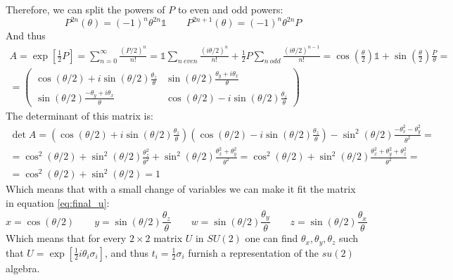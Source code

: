 \documentclass{article}
\begin{document}
Therefore, we can split the powers of $P$ to even and odd powers:
\begin{equation}
    P^{2n}(\theta) = \left(-1\right)^n\theta^{2n}\mathbb{1} \qquad P^{2n+1}(\theta) = \left(-1\right)^n\theta^{2n}P
\end{equation}
And thus
\begin{equation}
\begin{gathered}
\label{eq:su_final_rep}
    A = \exp \left[\frac{1}{2}P\right] = \sum_{n=0}^\infty \frac{(P/2)^n}{n!} =
    \mathbb{1}\sum_{n \ even}\frac{\left(i\theta/2\right)^n}{n!} + \frac{1}{2}P\sum_{n \ odd}\frac{\left(i\theta/2\right)^{n - 1}}{n!} = \cos(\frac{\theta}{2})\mathbb{1} + \sin(\frac{\theta}{2}) \frac{P}{\theta} = \\
    = \begin{pmatrix}
        \cos(\theta/2) + i\sin(\theta/2)\frac{\theta_z}{\theta} & \sin(\theta/2)\frac{\theta_y + i\theta_x}{\theta} \\ 
        \sin(\theta/2)\frac{-\theta_y + i\theta_x}{\theta} & \cos(\theta/2) - i\sin(\theta/2)\frac{\theta_z}{\theta}
    \end{pmatrix}
\end{gathered}
\end{equation}
The determinant of this matrix is:
\begin{equation}
\begin{gathered}
    \det A = \left(\cos(\theta/2) + i\sin(\theta/2)\frac{\theta_z}{\theta}\right) \left(\cos(\theta/2) - i\sin(\theta/2)\frac{\theta_z}{\theta}\right) - \sin^2(\theta/2)\frac{- \theta_x^2 - \theta_y^2}{\theta^2} = 
    \\
    = \cos^2(\theta/2) + \sin^2(\theta/2)\frac{\theta_z^2}{\theta^2} + \sin^2(\theta/2)\frac{\theta_x^2 + \theta_y^2}{\theta^2} = \cos^2(\theta/2) + \sin^2(\theta/2)\frac{\theta_x^2 + \theta_y^2 + \theta_z^2}{\theta^2} =
    \\
    = \cos^2(\theta/2) + \sin^2(\theta/2) = 1
\end{gathered} 
\end{equation}
Which means that with a small change of variables we can make it fit the matrix in equation \ref{eq:final_u}:
\begin{equation}
    x = \cos(\theta/2) \qquad y = \sin(\theta/2)\frac{\theta_z}{\theta}
    \qquad w = \sin(\theta/2)\frac{\theta_y}{\theta} \qquad z = \sin(\theta/2)\frac{\theta_x}{\theta}
\end{equation}
Which means that for every $2\times2$ matrix $U$ in $SU(2)$ one can find $\theta_x, \theta_y, \theta_z$ such that $U = \exp\left[\frac{1}{2}i \theta_i\sigma_i\right]$, and thus $t_i = \frac{1}{2}\sigma_i$ furnish a representation of the $su(2)$ algebra. 
\end{document}
